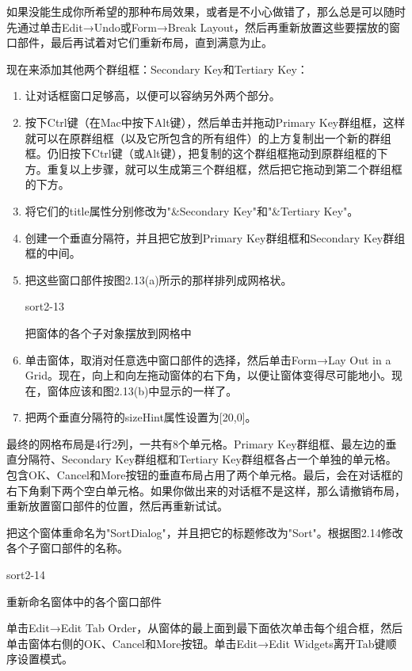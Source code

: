 \documentclass[11pt,oneside]{book}
\begin{document}
\begin{common-format}
如果没能生成你所希望的那种布局效果，或者是不小心做错了，那么总是可以随时先通过单击Edit→Undo或Form→Break Layout，然后再重新放置这些要摆放的窗口部件，最后再试着对它们重新布局，直到满意为止。

现在来添加其他两个群组框：Secondary Key和Tertiary Key：
\begin{enumerate}
\item 让对话框窗口足够高，以便可以容纳另外两个部分。
\item 按下Ctrl键（在Mac中按下Alt键），然后单击并拖动Primary Key群组框，这样就可以在原群组框（以及它所包含的所有组件）的上方复制出一个新的群组框。仍旧按下Ctrl键（或Alt键），把复制的这个群组框拖动到原群组框的下方。重复以上步骤，就可以生成第三个群组框，然后把它拖动到第二个群组框的下方。
\item 将它们的title属性分别修改为"\&{}Secondary Key"和"\&{}Tertiary Key"。
\item 创建一个垂直分隔符，并且把它放到Primary Key群组框和Secondary Key群组框的中间。
\item 把这些窗口部件按图2.13(a)所示的那样排列成网格状。

\begin{linefig}[0.8]{sort2-13}
\caption{把窗体的各个子对象摆放到网格中}
\label{fig:sort2-13}
\end{linefig}

\item 单击窗体，取消对任意选中窗口部件的选择，然后单击Form→Lay Out in a Grid。现在，向上和向左拖动窗体的右下角，以便让窗体变得尽可能地小。现在，窗体应该和图2.13(b)中显示的一样了。
\item 把两个垂直分隔符的sizeHint属性设置为[20,0]。
\end{enumerate}

最终的网格布局是4行2列，一共有8个单元格。Primary Key群组框、最左边的垂直分隔符、Secondary Key群组框和Tertiary Key群组框各占一个单独的单元格。包含OK、Cancel和More按钮的垂直布局占用了两个单元格。最后，会在对话框的右下角剩下两个空白单元格。如果你做出来的对话框不是这样，那么请撤销布局，重新放置窗口部件的位置，然后再重新试试。

把这个窗体重命名为"SortDialog"，并且把它的标题修改为"Sort"。根据图2.14修改各个子窗口部件的名称。
\begin{linefig}[0.8]{sort2-14}
\caption{重新命名窗体中的各个窗口部件}
\label{fig:sort2-14}
\end{linefig}
  
单击Edit→Edit Tab Order，从窗体的最上面到最下面依次单击每个组合框，然后单击窗体右侧的OK、Cancel和More按钮。单击Edit→Edit Widgets离开Tab键顺序设置模式。


\end{common-format}
\end{document}
